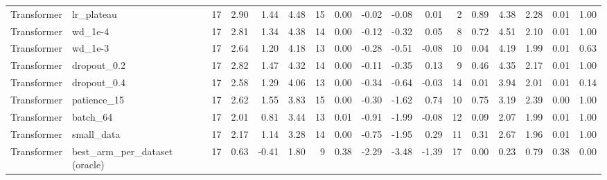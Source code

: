 \begin{table}
\begin{tabular}{llrrrrrrrrrrrrrrr}
Transformer & lr\_plateau & 17 & 2.90 & 1.44 & 4.48 & 15 & 0.00 & -0.02 & -0.08 & 0.01 & 2 & 0.89 & 4.38 & 2.28 & 0.01 & 1.00 \\
Transformer & wd\_1e-4 & 17 & 2.81 & 1.34 & 4.38 & 14 & 0.00 & -0.12 & -0.32 & 0.05 & 8 & 0.72 & 4.51 & 2.10 & 0.01 & 1.00 \\
Transformer & wd\_1e-3 & 17 & 2.64 & 1.20 & 4.18 & 13 & 0.00 & -0.28 & -0.51 & -0.08 & 10 & 0.04 & 4.19 & 1.99 & 0.01 & 0.63 \\
Transformer & dropout\_0.2 & 17 & 2.82 & 1.47 & 4.32 & 14 & 0.00 & -0.11 & -0.35 & 0.13 & 9 & 0.46 & 4.35 & 2.17 & 0.01 & 1.00 \\
Transformer & dropout\_0.4 & 17 & 2.58 & 1.29 & 4.06 & 13 & 0.00 & -0.34 & -0.64 & -0.03 & 14 & 0.01 & 3.94 & 2.01 & 0.01 & 0.14 \\
Transformer & patience\_15 & 17 & 2.62 & 1.55 & 3.83 & 15 & 0.00 & -0.30 & -1.62 & 0.74 & 10 & 0.75 & 3.19 & 2.39 & 0.00 & 1.00 \\
Transformer & batch\_64 & 17 & 2.01 & 0.81 & 3.44 & 13 & 0.01 & -0.91 & -1.99 & -0.08 & 12 & 0.09 & 2.07 & 1.99 & 0.01 & 1.00 \\
Transformer & small\_data & 17 & 2.17 & 1.14 & 3.28 & 14 & 0.00 & -0.75 & -1.95 & 0.29 & 11 & 0.31 & 2.67 & 1.96 & 0.01 & 1.00 \\
Transformer & best\_arm\_per\_dataset (oracle) & 17 & 0.63 & -0.41 & 1.80 & 9 & 0.38 & -2.29 & -3.48 & -1.39 & 17 & 0.00 & 0.23 & 0.79 & 0.38 & 0.00 \\
\bottomrule
\end{tabular}
\end{table}
